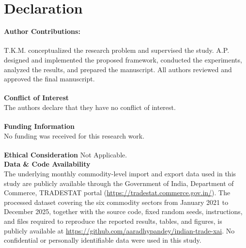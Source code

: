\documentclass[pdftex,sn-mathphys-num]{sn-jnl}
\begin{document}
\section{Declaration}
\textbf{Author Contributions:}\\\\
T.K.M. conceptualized the research problem and supervised the study. A.P. designed
and implemented the proposed framework, conducted the experiments, analyzed the
results, and prepared the manuscript. All authors reviewed and approved the final
manuscript.\\\\
\textbf{Conflict of Interest}\\
The authors declare that they have no conflict of interest.\\\\
\textbf{Funding Information}\\
No funding was received for this research work.\\\\
\textbf{Ethical Consideration} Not Applicable.\\
\textbf{Data \& Code Availability}\\
The underlying monthly commodity-level import and export data used in this study are publicly available through the Government of India, Department of Commerce, TRADESTAT portal (\url{https://tradestat.commerce.gov.in/}). The processed dataset covering the six commodity sectors from January 2021 to December 2025, together with the source code, fixed random seeds, instructions, and files required to reproduce the reported results, tables, and figures, is publicly available at \url{https://github.com/aaradhypandey/indian-trade-xai}. No confidential or personally identifiable data were used in this study.
\clearpage
\end{document}
